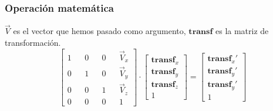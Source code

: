 \subsubsection{Operación matemática}
\(\overrightarrow{V}\) es el vector que hemos pasado como argumento, \(\mathbf{transf}\) es la matriz de transformación.
\begin{equation}
  \begin{bmatrix}
    1 && 0 && 0 && \overrightarrow{V}_x\\
    0 && 1 && 0 && \overrightarrow{V}_y\\
    0 && 0 && 1 && \overrightarrow{V}_z\\
    0 && 0 && 0 && 1
  \end{bmatrix}
  \cdot
  \begin{bmatrix}
    \mathbf{transf}_x\\\mathbf{transf}_y\\\mathbf{transf}_z\\1
  \end{bmatrix} =
  \begin{bmatrix}
    \mathbf{transf}_x'\\\mathbf{transf}_y'\\\mathbf{transf}_y'\\1
  \end{bmatrix}
\end{equation}
